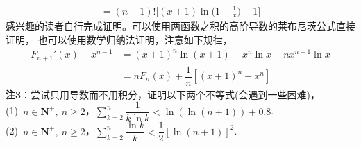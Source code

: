 \begin{enumerate}[label={【\textbf{例\thechapter.\arabic*}】},
 leftmargin=\inteval{\myenumleftmargin}pt,
 itemsep=\inteval{\myenumitempsep}pt,
 itemindent=\inteval{\myenumitemindent}pt]
\begin{gather*}
    =(n-1)!\Big[(x+1)\ln\Big(1+\frac{1}{x}\Big)-1\Big]
\end{gather*}
感兴趣的读者自行完成证明。可以使用两函数之积的高阶导数的莱布尼茨公式直接证明，
也可以使用数学归纳法证明，注意如下规律，
\begin{align*}
    F_{n+1}'(x)+x^{n-1} & =(x+1)^n\ln(x+1)-x^n\ln x-nx^{n-1}\ln x\\
    & =nF_n(x)+\dfrac{1}{n}[(x+1)^n-x^n]
\end{align*}
\textbf{注3}：尝试只用导数而不用积分，证明以下两个不等式(会遇到一些困难)，\\
(1)\ $ n\in \textbf{N}^+,\ n\geq 2 $，$ \sum\limits_{k=2}^{n}
\dfrac{1}{k\ln k}<\ln(\ln (n+1))+0.8 $.\\ 
(2)\ $ n\in \textbf{N}^+,\ n\geq 2 $，$ \sum\limits_{k=2}^{n}
\dfrac{\ln k}{k}<\dfrac{1}{2}[\ln(n+1)]^2 $.\\ 


\end{enumerate}
